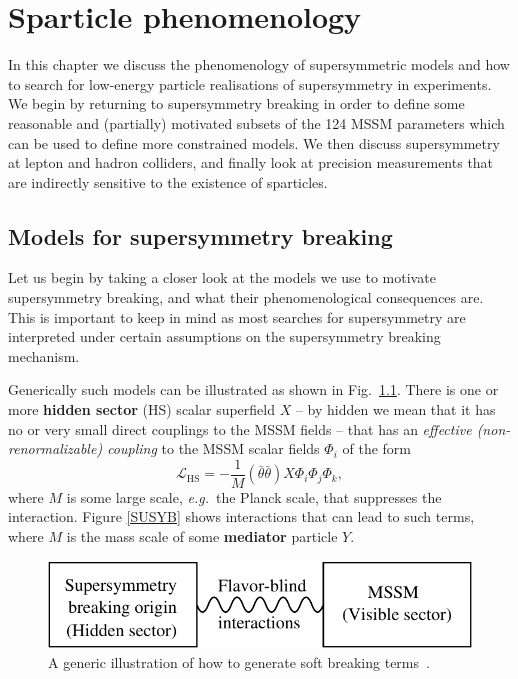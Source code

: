 \documentclass[notes.tex]{subfiles}
\begin{document}
\chapter{Sparticle phenomenology}
\label{chap:pheno}
In this chapter we discuss the phenomenology of supersymmetric models and how to search for low-energy particle realisations of supersymmetry in experiments. We begin by returning to supersymmetry breaking in order to define some reasonable and (partially) motivated subsets of the 124 MSSM parameters which can be used to define more constrained models. We then discuss supersymmetry at lepton and hadron colliders, and finally look at precision measurements that are indirectly sensitive to the existence of sparticles.


\section{Models for supersymmetry breaking} 
Let us begin by taking a closer look at the models we use to motivate supersymmetry breaking, and what their phenomenological consequences are. This is important to keep in mind as most searches for supersymmetry are interpreted under certain assumptions on the supersymmetry  breaking mechanism.

Generically such models can be illustrated as shown in Fig.~\ref{SSB}. There is one or more {\bf hidden sector} (HS) scalar superfield $X$ -- by hidden we mean that it has no or very small direct couplings to the MSSM fields -- that has an {\it effective (non-renormalizable) coupling} to the MSSM scalar fields $\Phi_i$ of the form
\begin{equation}
\mathcal{L}_\text{HS} = -\frac{1}{M}(\bar\theta\bar\theta)X\Phi_i\Phi_j\Phi_k,
\label{eq:HS_MSSM}
\end{equation}
where $M$ is some large scale, {\it e.g.}\ the Planck scale, that suppresses the interaction. Figure \ref{SUSYB} shows interactions that can lead to such terms, where $M$ is the mass scale of some {\bf mediator} particle $Y$. 

\begin{figure}[h!]
\centering
\includegraphics[scale=1.0]{figures/structure} 
\caption{A generic illustration of how to generate soft breaking terms~\cite{Martin:1997ns}. \label{SSB}}
\end{figure}
\end{document}

